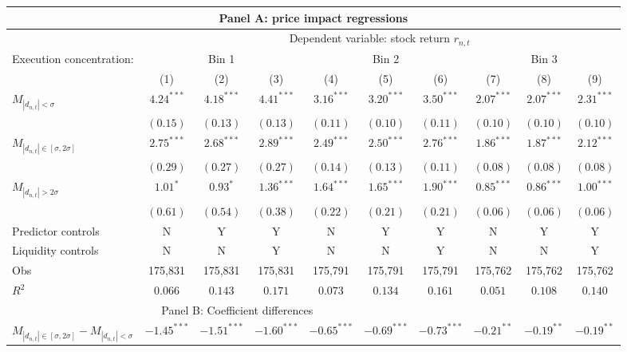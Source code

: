 \begin{tabular}{lccccccccc}
  \hline \multicolumn{10}{c}{Panel A: price impact regressions} \\
 \hline
                                    & \multicolumn{9}{c}{Dependent variable: stock return $r_{n,t}$} \\

                                    \cmidrule(l){2-10} Execution concentration: & \multicolumn{3}{c}{Bin 1} & \multicolumn{3}{c}{Bin 2} & \multicolumn{3}{c}{Bin 3} \\
 \cmidrule(l){2-4} \cmidrule(l){5-7} \cmidrule(l){8-10} 
  & (1) & (2) & (3) & (4) & (5) & (6) & (7) & (8) & (9) \\ 
  $M_{|d_{n,t}| < \sigma}$ & $4.24^{***}$ & $4.18^{***}$ & $4.41^{***}$ & $3.16^{***}$ & $3.20^{***}$ & $3.50^{***}$ & $2.07^{***}$ & $2.07^{***}$ & $2.31^{***}$ \\ 
   & $(0.15)$ & $(0.13)$ & $(0.13)$ & $(0.11)$ & $(0.10)$ & $(0.11)$ & $(0.10)$ & $(0.10)$ & $(0.10)$ \\ 
  $M_{|d_{n,t}| \in [\sigma, 2\sigma]}$ & $2.75^{***}$ & $2.68^{***}$ & $2.89^{***}$ & $2.49^{***}$ & $2.50^{***}$ & $2.76^{***}$ & $1.86^{***}$ & $1.87^{***}$ & $2.12^{***}$ \\ 
   & $(0.29)$ & $(0.27)$ & $(0.27)$ & $(0.14)$ & $(0.13)$ & $(0.11)$ & $(0.08)$ & $(0.08)$ & $(0.08)$ \\ 
  $M_{|d_{n,t}| > 2 \sigma}$ & $1.01^{*}$ & $0.93^{*}$ & $1.36^{***}$ & $1.64^{***}$ & $1.65^{***}$ & $1.90^{***}$ & $0.85^{***}$ & $0.86^{***}$ & $1.00^{***}$ \\ 
   \vspace{5pt} & $(0.61)$ & $(0.54)$ & $(0.38)$ & $(0.22)$ & $(0.21)$ & $(0.21)$ & $(0.06)$ & $(0.06)$ & $(0.06)$ \\ 
  Predictor controls & N & Y & Y & N & Y & Y & N & Y & Y \\ 
   \vspace{5pt}Liquidity controls & N & N & Y & N & N & Y & N & N & Y \\ 
  Obs & 175,831 & 175,831 & 175,831 & 175,791 & 175,791 & 175,791 & 175,762 & 175,762 & 175,762 \\ 
  $R^2$ & $0.066$ & $0.143$ & $0.171$ & $0.073$ & $0.134$ & $0.161$ & $0.051$ & $0.108$ & $0.140$ \\ 
   \hline \multicolumn{7}{c}{Panel B: Coefficient differences} \\
 \hline$M_{|d_{n,t}| \in [\sigma, 2\sigma]} - M_{|d_{n,t}| < \sigma}$ & $-1.45^{***}$ & $-1.51^{***}$ & $-1.60^{***}$ & $-0.65^{***}$ & $-0.69^{***}$ & $-0.73^{***}$ & $-0.21^{**}$ & $-0.19^{**}$ & $-0.19^{**}$ \\ 

\end{tabular}
